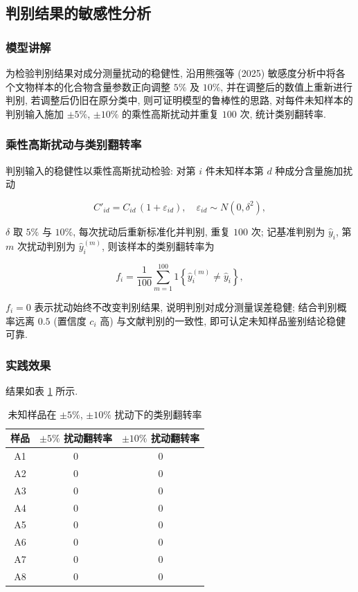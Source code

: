 \documentclass{ctexart}
\begin{document}
\subsection{判别结果的敏感性分析}

\subsubsection{模型讲解}

为检验判别结果对成分测量扰动的稳健性, 沿用熊强等 (2025) 敏感度分析中将各个文物样本的化合物含量参数正向调整 $5\%$ 及 $10\%$, 并在调整后的数值上重新进行判别, 若调整后仍旧在原分类中, 则可证明模型的鲁棒性的思路, 对每件未知样本的判别输入施加 $\pm5\%$, $\pm10\%$ 的乘性高斯扰动并重复 $100$ 次, 统计类别翻转率.


\subsubsection{乘性高斯扰动与类别翻转率}

判别输入的稳健性以乘性高斯扰动检验: 对第 $i$ 件未知样本第 $d$ 种成分含量施加扰动

\begin{equation*}
C'_{id}=C_{id}\,\left(1+\varepsilon_{id}\right),\quad\varepsilon_{id}\sim{N}\left(0,\delta^{2}\right),
\end{equation*}

$\delta$ 取 $5\%$ 与 $10\%$, 每次扰动后重新标准化并判别, 重复 $100$ 次; 记基准判别为 $\widehat{y}_i$, 第 $m$ 次扰动判别为 $\widehat{y}_i^{\left(m\right)}$, 则该样本的类别翻转率为

\begin{equation*}
f_i=\frac{1}{100}\sum_{m=1}^{100}\mathrm{1}\left\{\widehat{y}_i^{\left(m\right)}\neq\widehat{y}_i\right\},
\end{equation*}

$f_i=0$ 表示扰动始终不改变判别结果, 说明判别对成分测量误差稳健; 结合判别概率远离 $0.5$ (置信度 $c_i$ 高) 与文献判别的一致性, 即可认定未知样品鉴别结论稳健可靠.

\subsubsection{实践效果}

结果如表 \ref{tab:flip} 所示.

\begin{table}[htbp]
\centering
\caption{未知样品在 $\pm5\%$, $\pm10\%$ 扰动下的类别翻转率}
\label{tab:flip}
\begin{tabular}{c|c|c}
\hline
样品 & $\pm5\%$ 扰动翻转率 & $\pm10\%$ 扰动翻转率 \\
\hline
A1 & $0$ & $0$ \\
A2 & $0$ & $0$ \\
A3 & $0$ & $0$ \\
A4 & $0$ & $0$ \\
A5 & $0$ & $0$ \\
A6 & $0$ & $0$ \\
A7 & $0$ & $0$ \\
A8 & $0$ & $0$ \\
\hline
\end{tabular}
\end{table}
\end{document}
